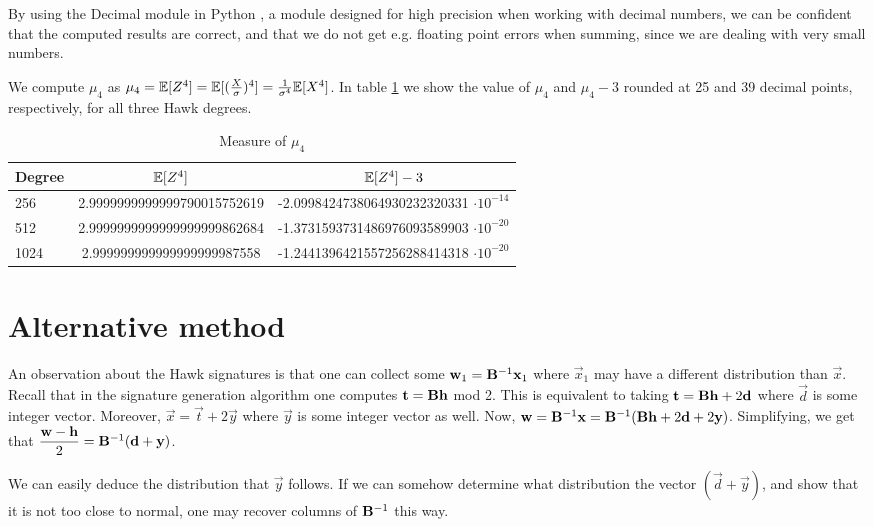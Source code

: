 By using the Decimal module in Python \cite{Decimal}, a module designed for high precision when working with decimal numbers, we can be confident that the computed results are correct, 
and that we do not get e.g. floating point errors when summing, since we are dealing with very small numbers.

We compute $\mu_4$ as $\mu_4 = \mathbb{E}[Z^4] = \mathbb{E}[(\frac{X}{\sigma})^4] = \frac{1}{\sigma^4}\mathbb{E}[X^4]$.
In table \ref{z4 values} we show the value of $\mu_4$ and $\mu_4 - 3$ rounded at 25 and 39 decimal points, respectively, for all three Hawk degrees.

\begin{table}[H]
    \centering
    \caption{Measure of $\mu_4$}
    \label{z4 values}
    \begin{tabular}{lcc}
        \toprule
        \textbf{Degree} & $\mathbb{E}[Z^4]$ & $\mathbb{E}[Z^4] - 3$ \\
        \midrule
        256 & 2.9999999999999790015752619 & -2.0998424738064930232320331 $\cdot 10^{-14}$ \\
        \midrule
        512 & 2.9999999999999999999862684 & -1.3731593731486976093589903 $\cdot 10^{-20}$ \\
        \midrule
        1024 & 2.999999999999999999987558 & -1.2441396421557256288414318 $\cdot 10^{-20}$ \\
        \bottomrule
    \end{tabular}
\end{table}

\section{Alternative method}
An observation about the Hawk signatures is that one can collect some $\mathbf{w}_1 = \mathbf{B}^{-1} \mathbf{x}_1$ where $\vec{x}_1$ may have a different distribution than $\vec{x}$.
Recall that in the signature generation algorithm one computes $\mathbf{t} = \mathbf{B} \mathbf{h}$ mod 2. This is equivalent to taking $\mathbf{t} = \mathbf{B} \mathbf{h} + 2 \mathbf{d}$ where $\vec{d}$ is some integer vector.
Moreover, $\vec{x} = \vec{t} + 2 \vec{y}$ where $\vec{y}$ is some integer vector as well.
Now, $\mathbf{w} = \mathbf{B}^{-1} \mathbf{x} = \mathbf{B}^{-1}(\mathbf{B} \mathbf{h} + 2 \mathbf{d} + 2 \mathbf{y})$. Simplifying, we get that $\mathlarger{\frac{\vec{w} - \vec{h}}{2}} = \mat{B}^{-1}(\vec{d} + \vec{y})$.

We can easily deduce the distribution that $\vec{y}$ follows.
If we can somehow determine what distribution the vector $(\vec{d} + \vec{y})$, and show that it is not too close to normal, one may recover columns of $\mathbf{B}^{-1}$ this way.

